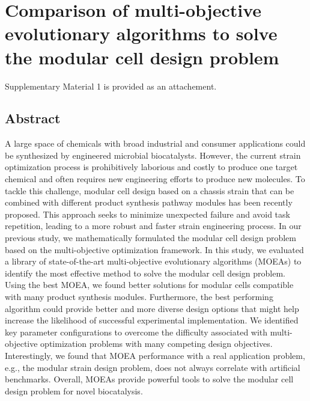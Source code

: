 \chapter{Comparison of multi-objective evolutionary algorithms to solve the modular cell design problem} %

\newcommand\HV{\mathit{HV}}
\newcommand\GD{\mathit{GD}}
\newcommand\IGD{\mathit{IGD}}

Supplementary Material 1 is provided as an attachement.


\section*{Abstract}
A large space of chemicals with broad industrial and consumer applications could be synthesized by engineered microbial biocatalysts. However, the current strain optimization process is prohibitively laborious and costly to produce one target chemical and often requires new engineering efforts to produce new molecules. To tackle this challenge, modular cell design based on a chassis strain that can be combined with different product synthesis pathway modules has been recently proposed.
This approach seeks to minimize unexpected failure and avoid task repetition, leading to a more robust and faster strain engineering process. In our previous study, we mathematically formulated
the modular cell design problem based on the multi-objective optimization framework. In this study, we evaluated a library of state-of-the-art multi-objective evolutionary algorithms (MOEAs) to identify the most effective method to solve the modular cell design problem.
Using the best MOEA, we found better solutions for modular cells compatible with many product synthesis modules. Furthermore, the best performing algorithm could provide better and more diverse design options that might help increase the likelihood of successful experimental implementation.
We identified key parameter configurations to overcome the difficulty associated with multi-objective optimization problems with many competing design objectives.
Interestingly, we found that MOEA performance with a real application problem, e.g., the modular strain design problem, does not always correlate with artificial benchmarks. Overall, MOEAs provide powerful tools to solve the modular cell design problem for novel biocatalysis.
